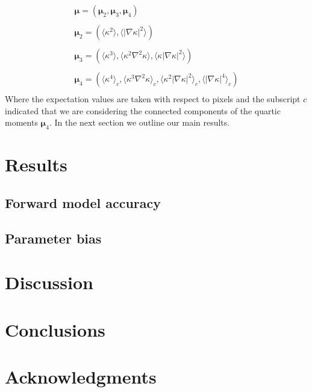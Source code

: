 \documentclass[reprint,aps,prd,superscriptaddress,showkeys,showpacs]{revtex4-1}
\begin{document}
\begin{equation}
\label{par:moments}
\begin{matrix}
\pmb{\mu} = (\pmb{\mu}_2,\pmb{\mu}_3,\pmb{\mu}_4) \\ \\
\pmb{\mu}_2 = \left(\langle\kappa^2\rangle,\langle\vert\nabla\kappa\vert^2\rangle\right) \\ \\
\pmb{\mu}_3 = \left(\langle\kappa^3\rangle,\langle\kappa^2\nabla^2\kappa\rangle,\langle\kappa\vert\nabla\kappa\vert^2\rangle\right) \\ \\
\pmb{\mu}_4 = \left(\langle\kappa^4\rangle_c,\langle\kappa^3\nabla^2\kappa\rangle_c,\langle\kappa^2\vert\nabla\kappa\vert^2\rangle_c,\langle\vert\nabla\kappa\vert^4\rangle_c\right) \\
\end{matrix}
\end{equation} 
%
Where the expectation values are taken with respect to pixels and the subscript $c$ indicated that we are considering the connected components of the quartic moments $\pmb{\mu}_4$. In the next section we outline our main results.  


\section{Results}
% 

\subsection{Forward model accuracy}

\subsection{Parameter bias}


\section{Discussion}
% 


\section{Conclusions}
% 


\section*{Acknowledgments}





\label{lastpage}
\end{document}
